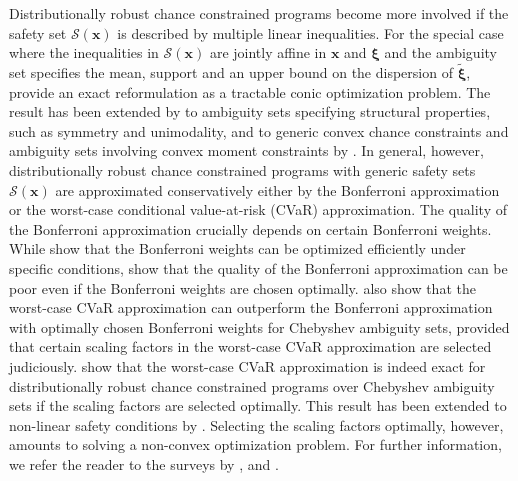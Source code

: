 \documentclass[nonblindrev]{informs2017}
\newcommand{\1}[1]{\mathds{1}{\left(#1\right)}}
\begin{document}
Distributionally robust chance constrained programs become more involved if the safety set $\mathcal{S} (\bm{x})$ is described by multiple linear inequalities. For the special case where the inequalities in $\mathcal{S} (\bm{x})$ are jointly affine in $\bm{x}$ and $\bm{\xi}$ and the ambiguity set specifies the mean, support and an upper bound on the dispersion of $\tilde{\bm{\xi}}$, \cite{Hanasusanto_Roitch_Kuhn_Wiesemann_2017} provide an exact reformulation as a tractable conic optimization problem. The result has been extended by \cite{Hanasusanto_Roitch_Kuhn_Wiesemann_2015} to ambiguity sets specifying structural properties, such as symmetry and unimodality, and to generic convex chance constraints and ambiguity sets involving convex moment constraints by \cite{xie2018deterministic}. In general, however, distributionally robust chance constrained programs with generic safety sets $\mathcal{S} (\bm{x})$ are approximated conservatively either by the Bonferroni approximation or the worst-case conditional value-at-risk (CVaR) approximation. The quality of the Bonferroni approximation crucially depends on certain Bonferroni weights. While \cite{xie2017optimized} show that the Bonferroni weights can be optimized efficiently under specific conditions, \cite{Chen_Sim_Sun_Teo_2010} show that the quality of the Bonferroni approximation can be poor even if the Bonferroni weights are chosen optimally. \cite{Chen_Sim_Sun_Teo_2010} also show that the worst-case CVaR approximation can outperform the Bonferroni approximation with optimally chosen Bonferroni weights for Chebyshev ambiguity sets, provided that certain scaling factors in the worst-case CVaR approximation are selected judiciously. \cite{zymler2013distributionally} show that the worst-case CVaR approximation is indeed exact for distributionally robust chance constrained programs over Chebyshev ambiguity sets if the scaling factors are selected optimally. This result has been extended to non-linear safety conditions by \cite{yang2016distributionally}. Selecting the scaling factors optimally, however, amounts to solving a non-convex optimization problem. For further information, we refer the reader to the surveys by \cite{Ben-tal_Nemirovski_book}, \cite{nemirovski2012safe} and \cite{Hanasusanto_Roitch_Kuhn_Wiesemann_2015}.
\end{document}
